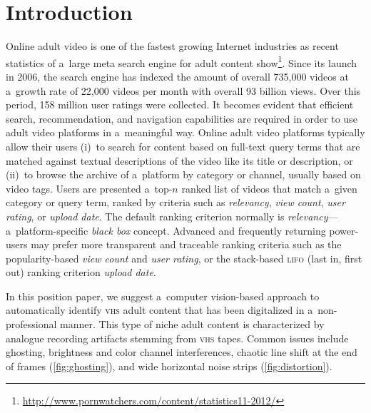 \documentclass{sig-alternate}
\begin{document}


\section{Introduction}

Online adult video is one of the fastest growing Internet industries
as recent statistics of a~large meta search engine for adult content
show\footnote{\url{http://www.pornwatchers.com/content/statistics11-2012/}}.
Since its launch in 2006, the search engine has indexed
the amount of overall 735,000 videos at a~growth rate of 22,000 videos per month
with overall 93 billion views.
Over this period, 158 million user ratings were collected.
It becomes evident that efficient search, recommendation, and
navigation capabilities are required in order to use
adult video platforms in a~meaningful way.
Online adult video platforms typically allow their users
(i)~to search for content based on full-text query terms
that are matched against textual descriptions
of the video like its title or description,
or (ii)~to browse the archive of a~platform by category or channel,
usually based on video tags.
Users are presented a~top-$n$ ranked list of videos
that match a~given category
or query term, ranked by criteria such as
\emph{relevancy}, \emph{view count},
\emph{user rating}, or \emph{upload date}.
The default ranking criterion normally is
\emph{relevancy}---a~platform-specific \emph{black box} concept.
Advanced and frequently returning power-users
may prefer more transparent and traceable ranking criteria
such as the popularity-based \emph{view count}
and \emph{user rating}, or the stack-based
{\scshape lifo} (last in, first out) ranking criterion \emph{upload date}.

In this position paper, we suggest a~computer vision-based
approach to automatically identify {\scshape vhs} adult content
that has been digitalized in a~non-professional manner.
This type of niche adult content is characterized by
analogue recording artifacts stemming from {\scshape vhs} tapes.
Common issues include
ghosting, brightness and color channel interferences,
chaotic line shift at the end of frames (\autoref{fig:ghosting}),
and wide horizontal noise strips (\autoref{fig:distortion}).
\end{document}
